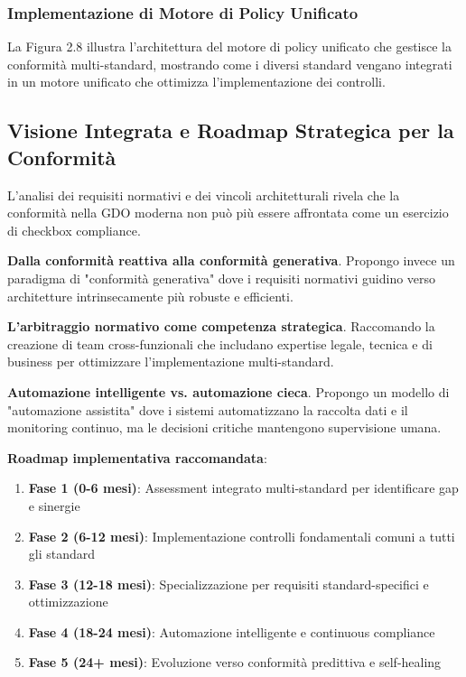 \documentclass[12pt,a4paper,oneside]{book}
\begin{document}
\subsubsection{Implementazione di Motore di Policy Unificato}

La Figura 2.8 illustra l'architettura del motore di policy unificato che gestisce la conformità multi-standard, mostrando come i diversi standard vengano integrati in un motore unificato che ottimizza l'implementazione dei controlli.

\subsection{Visione Integrata e Roadmap Strategica per la Conformità}

L'analisi dei requisiti normativi e dei vincoli architetturali rivela che la conformità nella GDO moderna non può più essere affrontata come un esercizio di checkbox compliance.

\textbf{Dalla conformità reattiva alla conformità generativa}. Propongo invece un paradigma di "conformità generativa" dove i requisiti normativi guidino verso architetture intrinsecamente più robuste e efficienti.

\textbf{L'arbitraggio normativo come competenza strategica}. Raccomando la creazione di team cross-funzionali che includano expertise legale, tecnica e di business per ottimizzare l'implementazione multi-standard.

\textbf{Automazione intelligente vs. automazione cieca}. Propongo un modello di "automazione assistita" dove i sistemi automatizzano la raccolta dati e il monitoring continuo, ma le decisioni critiche mantengono supervisione umana.

\textbf{Roadmap implementativa raccomandata}:
\begin{enumerate}
\item \textbf{Fase 1 (0-6 mesi)}: Assessment integrato multi-standard per identificare gap e sinergie
\item \textbf{Fase 2 (6-12 mesi)}: Implementazione controlli fondamentali comuni a tutti gli standard
\item \textbf{Fase 3 (12-18 mesi)}: Specializzazione per requisiti standard-specifici e ottimizzazione
\item \textbf{Fase 4 (18-24 mesi)}: Automazione intelligente e continuous compliance
\item \textbf{Fase 5 (24+ mesi)}: Evoluzione verso conformità predittiva e self-healing
\end{enumerate}
\end{document}
